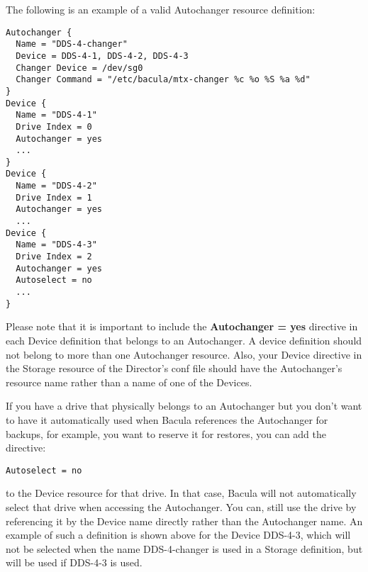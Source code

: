 The following is an example of a valid Autochanger resource definition: 

\footnotesize
\begin{verbatim}
Autochanger {
  Name = "DDS-4-changer"
  Device = DDS-4-1, DDS-4-2, DDS-4-3
  Changer Device = /dev/sg0
  Changer Command = "/etc/bacula/mtx-changer %c %o %S %a %d"
}
Device {
  Name = "DDS-4-1"
  Drive Index = 0
  Autochanger = yes
  ...
}
Device {
  Name = "DDS-4-2"
  Drive Index = 1
  Autochanger = yes
  ...
Device {
  Name = "DDS-4-3"
  Drive Index = 2
  Autochanger = yes
  Autoselect = no
  ...
}
\end{verbatim}
\normalsize

Please note that it is important to include the {\bf Autochanger = yes} directive
in each Device definition that belongs to an Autochanger.  A device definition
should not belong to more than one Autochanger resource.  Also, your Device
directive in the Storage resource of the Director's conf file should have
the Autochanger's resource name rather than a name of one of the Devices.

If you have a drive that physically belongs to an Autochanger but you don't want
to have it automatically used when Bacula references the Autochanger for backups,
for example, you want to reserve it for restores, you can add the directive:

\footnotesize
\begin{verbatim}
Autoselect = no
\end{verbatim}
\normalsize

to the Device resource for that drive. In that case, Bacula will not automatically
select that drive when accessing the Autochanger. You can, still use the drive
by referencing it by the Device name directly rather than the Autochanger name. An example
of such a definition is shown above for the Device DDS-4-3, which will not be
selected when the name DDS-4-changer is used in a Storage definition, but will
be used if DDS-4-3 is used.
